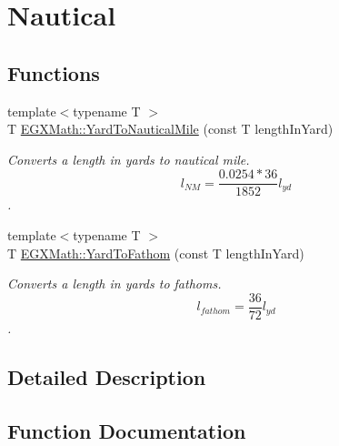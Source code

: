 \hypertarget{group___e_g_x_math-_conversions-_length_conversions-_imperial-_yard-_nautical}{}\section{Nautical}
\label{group___e_g_x_math-_conversions-_length_conversions-_imperial-_yard-_nautical}
\subsection*{Functions}
\begin{DoxyCompactItemize}
\item 
{\footnotesize template$<$typename T $>$ }\\T \mbox{\hyperlink{group___e_g_x_math-_conversions-_length_conversions-_imperial-_yard-_nautical_gafdd0ac310bcfdaf8cf676f823018b6d7}{E\+G\+X\+Math\+::\+Yard\+To\+Nautical\+Mile}} (const T length\+In\+Yard)
\begin{DoxyCompactList}\small\item\em Converts a length in yards to nautical mile. \[ l_{NM}= \frac{0.0254 * 36}{1852} l_{yd} \]. \end{DoxyCompactList}\item 
{\footnotesize template$<$typename T $>$ }\\T \mbox{\hyperlink{group___e_g_x_math-_conversions-_length_conversions-_imperial-_yard-_nautical_ga74f4a71a621c03bbf1c540710719ec25}{E\+G\+X\+Math\+::\+Yard\+To\+Fathom}} (const T length\+In\+Yard)
\begin{DoxyCompactList}\small\item\em Converts a length in yards to fathoms. \[ l_{fathom}= \frac{36}{72} l_{yd} \]. \end{DoxyCompactList}\end{DoxyCompactItemize}


\subsection{Detailed Description}


\subsection{Function Documentation}
\mbox{\label{group___e_g_x_math-_conversions-_length_conversions-_imperial-_yard-_nautical_ga74f4a71a621c03bbf1c540710719ec25}} 
